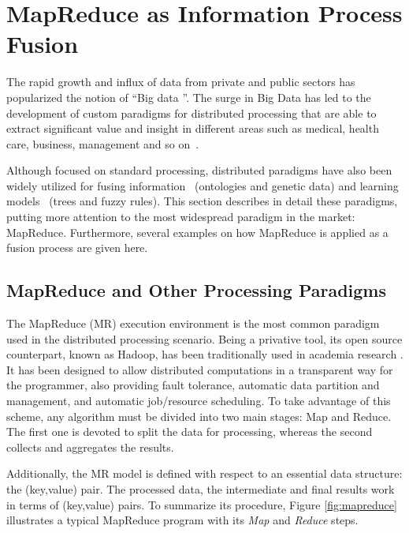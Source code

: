 \documentclass[3p,review]{elsarticle}
\begin{document}
\section{MapReduce as Information Process Fusion}\label{sec:mr}

The rapid growth and influx of data from private and public sectors has popularized the notion of ``Big data \cite{Fer14}''. The surge in Big Data has led to the development of custom paradigms for distributed processing that are able to extract significant value and insight in different areas such as medical, health care, business, management and so on~\cite{Kam14,Chen14,wu14}. 

Although focused on standard processing, distributed paradigms have also been widely utilized for fusing information~\cite{zhang14b, meng15} (ontologies and genetic data) and learning models~\cite{rio14b, rio15b} (trees and fuzzy rules). This section describes in detail these paradigms, putting more attention to the most widespread paradigm in the market: MapReduce. Furthermore, several examples on how MapReduce is applied as a fusion process are given here.

\subsection{MapReduce and Other Processing Paradigms}\label{subsec:mr}


The MapReduce (MR) execution environment \cite{Dea08} is the most common paradigm used in the distributed processing scenario. Being a privative tool, its open source counterpart, known as Hadoop, has been traditionally used in academia research \cite{Whi15-Hadoop}. It has been designed to allow distributed computations in a transparent way for the programmer, also providing fault tolerance, automatic data partition and management, and automatic job/resource scheduling. To take advantage of this scheme, any algorithm must be divided into two main stages: Map and Reduce. The first one is devoted to split the data for processing, whereas the second collects and aggregates the results.

Additionally, the MR model is defined with respect to an essential data structure: the (key,value) pair. The processed data, the intermediate and final results work in terms of (key,value) pairs. To summarize its procedure, Figure \ref{fig:mapreduce} illustrates a typical MapReduce program with its \textit{Map} and \textit{Reduce} steps. %
\end{document}
